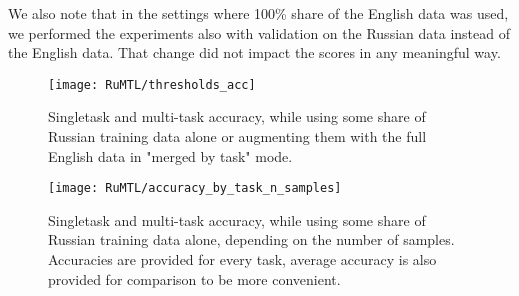 \begin{itemize}
\begin{table*}
We also note that in the settings where 100\% share of the English data was used, we performed the experiments also with validation on the Russian data instead of the English data. That change did not impact the scores in any meaningful way.

\begin{figure}[ht]
    \texttt{[image: RuMTL/thresholds\_acc]}
  \caption{Singletask and multi-task accuracy, while using some share of Russian training data alone or augmenting them with the full English data in "merged by task" mode.}\label{fig:thresholds_acc}
\end{figure}
\begin{figure}[ht]
    \texttt{[image: RuMTL/accuracy\_by\_task\_n\_samples]}
  \caption{Singletask and multi-task accuracy, while using some share of Russian training data alone, depending on the number of samples. Accuracies are provided for every task, average accuracy is also provided for comparison to be more convenient.}\label{fig:accuracy_by_task_n_samples}
\end{figure}


 
 

\end{table*}
\end{itemize}
